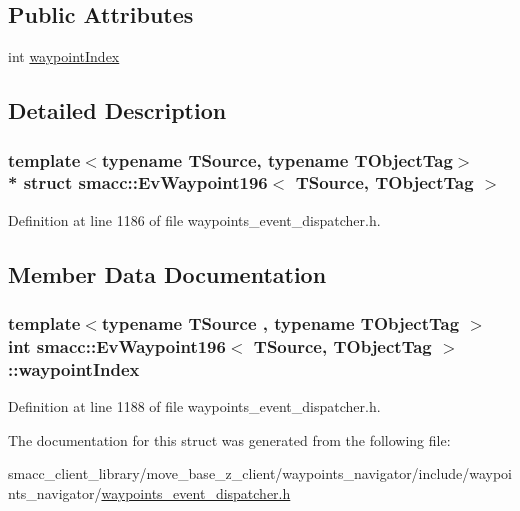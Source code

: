 \subsection*{Public Attributes}
\begin{DoxyCompactItemize}
\item 
int \hyperlink{structsmacc_1_1EvWaypoint196_ad8f4f253d6076243ae996ff6968acf8a}{waypoint\+Index}
\end{DoxyCompactItemize}


\subsection{Detailed Description}
\subsubsection*{template$<$typename T\+Source, typename T\+Object\+Tag$>$\\*
struct smacc\+::\+Ev\+Waypoint196$<$ T\+Source, T\+Object\+Tag $>$}



Definition at line 1186 of file waypoints\+\_\+event\+\_\+dispatcher.\+h.



\subsection{Member Data Documentation}
\subsubsection[{\texorpdfstring{waypoint\+Index}{waypointIndex}}]{\setlength{\rightskip}{0pt plus 5cm}template$<$typename T\+Source , typename T\+Object\+Tag $>$ int {\bf smacc\+::\+Ev\+Waypoint196}$<$ T\+Source, T\+Object\+Tag $>$\+::waypoint\+Index}\hypertarget{structsmacc_1_1EvWaypoint196_ad8f4f253d6076243ae996ff6968acf8a}{}\label{structsmacc_1_1EvWaypoint196_ad8f4f253d6076243ae996ff6968acf8a}


Definition at line 1188 of file waypoints\+\_\+event\+\_\+dispatcher.\+h.



The documentation for this struct was generated from the following file\+:\begin{DoxyCompactItemize}
\item 
smacc\+\_\+client\+\_\+library/move\+\_\+base\+\_\+z\+\_\+client/waypoints\+\_\+navigator/include/waypoints\+\_\+navigator/\hyperlink{waypoints__event__dispatcher_8h}{waypoints\+\_\+event\+\_\+dispatcher.\+h}\end{DoxyCompactItemize}
